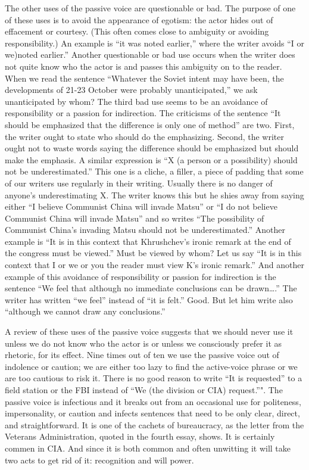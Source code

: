 \documentclass[
    oneside,
    11pt,
    draft
]{memoir}
\begin{document}
The other uses of the passive voice are questionable or bad. The purpose of one of these uses is to avoid the appearance of egotism: the actor hides out of effacement or courtesy. (This often comes close to ambiguity or avoiding responsibility.) An example is \enquote{it was noted earlier,} where the writer avoids \enquote{I or we)noted earlier.} Another questionable or bad use occurs when the writer does not quite know who the actor is and passes this ambiguity on to the reader. When we read the sentence \enquote{Whatever the Soviet intent may have been, the developments of 21-23 October were probably unanticipated,} we ask unanticipated by whom? The third bad use seems to be an avoidance of responsibility or a passion for indirection. The criticisms of the sentence \enquote{It should be emphasized that the difference is only one of method} are two. First, the writer ought to state who should do the emphasizing. Second, the writer ought not to waste words saying the difference should be emphasized but should make the emphasis. A similar expression is \enquote{X (a person or a possibility) should not be underestimated.} This one is a cliche, a filler, a piece of padding that some of our writers use regularly in their writing. Usually there is no danger of anyone's underestimating X. The writer knows this but he shies away from saying either \enquote{I believe Communist China will invade Matsu} or \enquote{I do not believe Communist China will invade Matsu} and so writes \enquote{The possibility of Communist China's invading Matsu should not be underestimated.} Another example is \enquote{It is in this context that Khrushchev's ironic remark at the end of the congress must be viewed.} Must be viewed by whom? Let us say \enquote{It is in this context that I or we or you the reader must view K's ironic remark.} And another example of this avoidance of responsibility or passion for indirection is the sentence \enquote{We feel that although no immediate conclusions can be drawn\dots.} The writer has written \enquote{we feel} instead of \enquote{it is felt.} Good. But let him write also \enquote{although we cannot draw any conclusions.} 

A review of these uses of the passive voice suggests that we should never use it unless we do not know who the actor is or unless we consciously prefer it as rhetoric, for its effect. Nine times out of ten we use the passive voice out of indolence or caution; we are either too lazy to find the active-voice phrase or we are too cautious to risk it. There is no good reason to write \enquote{It is requested} to a field station or the FBI instead of \enquote{We (the division or CIA) request.}". The passive voice is infectious and it breaks out from an occasional use for politeness, impersonality, or caution and infects sentences that need to be only clear, direct, and straightforward. It is one of the cachets of bureaucracy, as the letter from the Veterans Administration, quoted in the fourth essay, shows. It is certainly commen in CIA. And since it is both common and often unwitting it will take two acts to get rid of it: recognition and will power. 
\end{document}
